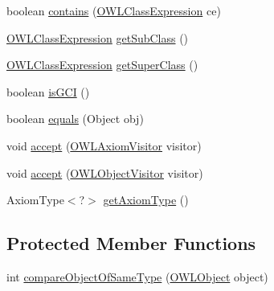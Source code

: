 \begin{DoxyCompactItemize}
\item 
boolean \hyperlink{classuk_1_1ac_1_1manchester_1_1cs_1_1owl_1_1owlapi_1_1_o_w_l_sub_class_of_axiom_impl_a398d782c7541c07952d6483248522726}{contains} (\hyperlink{interfaceorg_1_1semanticweb_1_1owlapi_1_1model_1_1_o_w_l_class_expression}{O\-W\-L\-Class\-Expression} ce)
\item 
\hyperlink{interfaceorg_1_1semanticweb_1_1owlapi_1_1model_1_1_o_w_l_class_expression}{O\-W\-L\-Class\-Expression} \hyperlink{classuk_1_1ac_1_1manchester_1_1cs_1_1owl_1_1owlapi_1_1_o_w_l_sub_class_of_axiom_impl_ad7fd5bf2e3f57d1f5b9698031220a69a}{get\-Sub\-Class} ()
\item 
\hyperlink{interfaceorg_1_1semanticweb_1_1owlapi_1_1model_1_1_o_w_l_class_expression}{O\-W\-L\-Class\-Expression} \hyperlink{classuk_1_1ac_1_1manchester_1_1cs_1_1owl_1_1owlapi_1_1_o_w_l_sub_class_of_axiom_impl_a3b65b482b064c3b551863f1dfe117b3b}{get\-Super\-Class} ()
\item 
boolean \hyperlink{classuk_1_1ac_1_1manchester_1_1cs_1_1owl_1_1owlapi_1_1_o_w_l_sub_class_of_axiom_impl_abb286a34c85a59ad10b0c4c68b1e4cb0}{is\-G\-C\-I} ()
\item 
boolean \hyperlink{classuk_1_1ac_1_1manchester_1_1cs_1_1owl_1_1owlapi_1_1_o_w_l_sub_class_of_axiom_impl_af169c036f87c48b505d7ade5be55100e}{equals} (Object obj)
\item 
void \hyperlink{classuk_1_1ac_1_1manchester_1_1cs_1_1owl_1_1owlapi_1_1_o_w_l_sub_class_of_axiom_impl_a0a443643e1e16609448d06b08b02a5e6}{accept} (\hyperlink{interfaceorg_1_1semanticweb_1_1owlapi_1_1model_1_1_o_w_l_axiom_visitor}{O\-W\-L\-Axiom\-Visitor} visitor)
\item 
void \hyperlink{classuk_1_1ac_1_1manchester_1_1cs_1_1owl_1_1owlapi_1_1_o_w_l_sub_class_of_axiom_impl_af636ecc941f13befa276c18b5098dddc}{accept} (\hyperlink{interfaceorg_1_1semanticweb_1_1owlapi_1_1model_1_1_o_w_l_object_visitor}{O\-W\-L\-Object\-Visitor} visitor)
\item 
Axiom\-Type$<$?$>$ \hyperlink{classuk_1_1ac_1_1manchester_1_1cs_1_1owl_1_1owlapi_1_1_o_w_l_sub_class_of_axiom_impl_a52faa768f194658af4924095d649de71}{get\-Axiom\-Type} ()
\end{DoxyCompactItemize}
\subsection*{Protected Member Functions}
\begin{DoxyCompactItemize}
\item 
int \hyperlink{classuk_1_1ac_1_1manchester_1_1cs_1_1owl_1_1owlapi_1_1_o_w_l_sub_class_of_axiom_impl_aca321a1b71af688518a1376218b2d567}{compare\-Object\-Of\-Same\-Type} (\hyperlink{interfaceorg_1_1semanticweb_1_1owlapi_1_1model_1_1_o_w_l_object}{O\-W\-L\-Object} object)
\end{DoxyCompactItemize}

